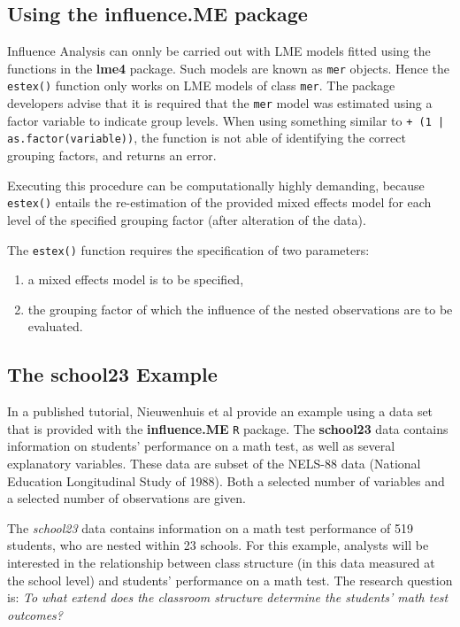 \documentclass[12pt, a4paper]{article}
\begin{document}
\subsection*{Using the influence.ME package}
Influence Analysis can onnly be carried out with LME models fitted using the functions in the \textbf{lme4} package. Such models are known as \texttt{mer} objects.
Hence the \texttt{estex()} function only works on LME
models of class \texttt{mer}.
The package developers advise that it is required that the \texttt{mer} model was estimated using a factor variable to indicate group levels.
When using something similar to \texttt{+ (1 | as.factor(variable))}, the function is not able of
identifying the correct grouping factors, and returns an error.

Executing this procedure can be computationally highly demanding, because \texttt{estex()} entails the re-estimation of the provided mixed effects model for each level of the specified grouping factor (after alteration of the data).


The \texttt{estex()} function requires the specification of two parameters: 
\begin{enumerate}
\item a mixed effects model is to be specified,
\item the grouping factor of which the influence of the nested observations are to be evaluated. 
\end{enumerate}

\subsection*{ The school23 Example }
In a published tutorial, Nieuwenhuis et al provide an example using a data set that is provided with the \textbf{influence.ME} \texttt{R} package. The \textbf{school23} data contains information on students’ performance on a math test, as well as several
explanatory variables. These data are subset of the NELS-88 data (National Education Longitudinal
Study of 1988). Both a selected number of variables and a selected number of observations are given.


The \textit{school23} data contains information on a math test performance of 519 students, who are nested within 23 schools. For this example,  analysts will be interested in the relationship between class structure (in this data measured at the school level) and students’ performance on a math test. The research question is: \textit{To what extend does the classroom structure determine the students’ math test outcomes?}
\end{document}
